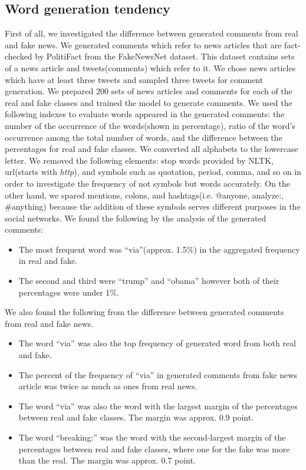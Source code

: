 \documentclass[conference]{IEEEtran}
\begin{document}
\subsection{Word generation tendency}
\label{subsec:trend}
First of all, we investigated the difference between generated comments from real and fake news.
We generated comments which refer to news articles that are fact-checked by PolitiFact from the FakeNewsNet dataset\cite{Shu2018FakeNewsNetAD}.
This dataset contains sets of a news article and tweets(comments) which refer to it.
We chose news articles which have at least three tweets and sampled three tweets for comment generation.
We prepared 200 sets of news articles and comments for each of the real and fake classes and trained the model to generate comments.
We used the following indexes to evaluate words appeared in the generated comments:
the number of the occurrence of the words(shown in percentage),
ratio of the word's occurrence among the total number of words,
and the difference between the percentages for real and fake classes.
We converted all alphabets to the lowercase letter.
We removed the following elements: stop words provided by NLTK\cite{bird-loper-2004-nltk}, 
url(starts with \textit{http}),
 and symbols such as quotation, period, comma, and so on in order to investigate the frequency of not symbols but words accurately.
On the other hand, we spared mentions, colons, and hashtags(i.e. @anyone, analyze:, \#anything)
 because the addition of these symbols serves different purposes in the social networks.
We found the following by the analysis of the generated comments:
\begin{itemize}[]
    \item The most frequent word was ``via''(approx. 1.5\%) in the aggregated frequency in real and fake.  
    \item The second and third were ``trump'' and ``obama'' however both of their percentages were under 1\%.
\end{itemize}
We also found the following from the difference between generated comments from real and fake news.
\begin{itemize}[]
    \item The word ``via'' was also the top frequency of generated word from both real and fake. 
    \item The percent of the frequency of ``via'' in generated comments from fake news article was twice as much as ones from real news.
    \item The word ``via'' was also the word with the largest margin of the percentages between real and fake classes. 
    The margin was approx. 0.9 point.
    \item The word ``breaking:'' was the word with the second-largest margin of the percentages between real and fake classes, 
    where one for the fake was more than the real. 
    The margin was approx. 0.7 point.
\end{itemize}
\end{document}
